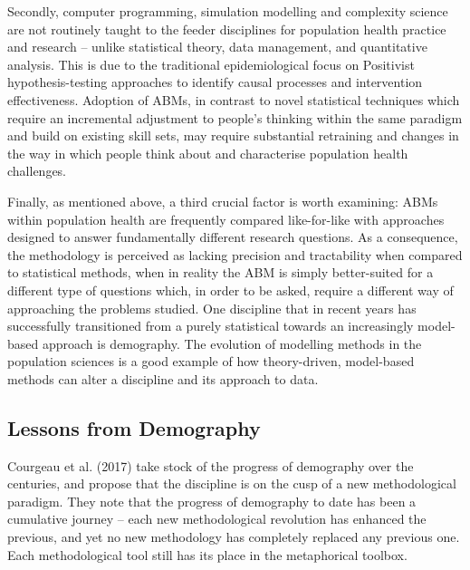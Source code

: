 \documentclass[review]{elsarticle}
\begin{document}
Secondly, computer programming, simulation modelling and complexity science are not routinely taught to the feeder disciplines for population health practice and research -- unlike  statistical theory, data management, and quantitative analysis.  This is due to the traditional epidemiological focus on Positivist hypothesis-testing approaches to identify causal processes and intervention effectiveness.  Adoption of ABMs, in contrast to novel statistical techniques which require an incremental adjustment to people's thinking within the same paradigm and build on existing skill sets, may require substantial retraining and changes in the way in which people think about and characterise population health challenges.

Finally, as mentioned above, a third crucial factor is worth examining: ABMs within population health are frequently compared like-for-like with approaches designed to answer fundamentally different research questions. As a consequence, the methodology is perceived as lacking precision and tractability when compared to statistical methods, when in reality the ABM is simply better-suited for a different type of questions which, in order to be asked, require a different way of approaching the problems studied.
One discipline that in recent years has successfully transitioned from a purely statistical towards an increasingly model-based approach is demography. The evolution of modelling methods in the population sciences is a good example of how theory-driven, model-based methods can alter a discipline and its approach to data.

\subsection{Lessons from Demography}

Courgeau et al. (2017) take stock of the progress of demography over the centuries, and propose that the discipline is on the cusp of a new methodological paradigm.  They note that the progress of demography to date has been a cumulative journey -- each new methodological revolution has enhanced the previous, and yet no new methodology has completely replaced any previous one.  Each methodological tool still has its place in the metaphorical toolbox. 
\end{document}
